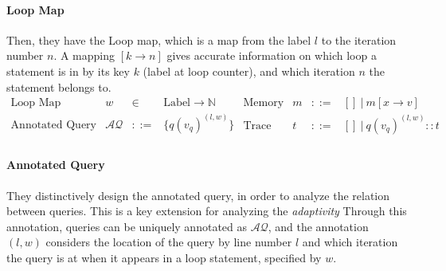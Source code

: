 \paragraph{Loop Map}
Then, they have the Loop map, which is a map from the label $l$ to the iteration number $n$.
  A mapping $[k \to n]$ gives accurate information on which loop a statement is in by its key $k$ (label at loop counter),
  and which iteration $n$ the statement belongs to.
\[
\begin{array}{llll}
 \mbox{Loop Map} & w & \in & \mbox{Label} \to \mathbb{N} \\
\mbox{Annotated Query} & \mathcal{AQ}  & ::= & \{ q(v_q)^{(l,w)}  \} \\
\end{array}
\begin{array}{llll}
    \mbox{Memory} & m & ::= & [] ~|~ m[x \to v] \\
\mbox{Trace} & t & ::= & [] ~|~ q(v_q)^{(l, w) } :: t \\
\end{array}
\]

 \paragraph{Annotated Query} 
 They 
distinctively design the annotated query, in order to analyze the relation between queries. This is a key extension for analyzing the \emph{adaptivity}
Through this annotation, queries can be uniquely annotated as $\mathcal{AQ}$,
  and the annotation $(l,w)$ considers the location of the query
  by line number $l$ and which iteration the query is at when it appears in a loop statement, specified by $w$.
